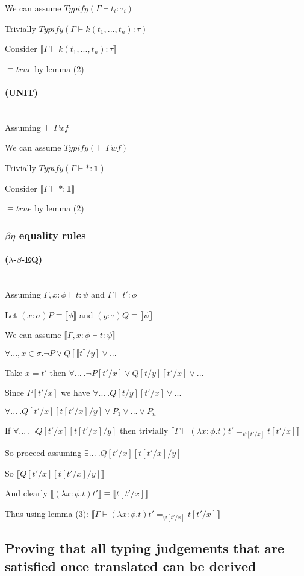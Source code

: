 \documentclass[12pt,a4paper,titlepage]{article}
\newcommand{\typify}{\textit{Typify}}
\newcommand{\bbrackets}[1]{\llbracket #1 \rrbracket}
\begin{document}
    We can assume $\typify (\Gamma \vdash t_i : \tau_i)$

    Trivially $\typify (\Gamma \vdash k(t_1, ..., t_n) : \tau)$

    Consider $\bbrackets{\Gamma \vdash k(t_1, ..., t_n): \tau}$

    $\equiv true$ by lemma (2)

    \paragraph{(UNIT)}\mbox{}\\

    Assuming $\vdash \Gamma wf$

    We can assume $\typify (\vdash \Gamma wf)$

    Trivially $\typify (\Gamma \vdash \ast : \textbf{1})$

    Consider $\bbrackets{\Gamma \vdash \ast : \textbf{1}}$

    $\equiv true$ by lemma (2)

    \subsubsection{$\beta\eta$ equality rules}

    \paragraph{($\lambda$-$\beta$-EQ)}\mbox{}\\

    Assuming $\Gamma, x: \phi \vdash t: \psi$ and $\Gamma \vdash t': \phi$

    Let $(x: \sigma)P \equiv \bbrackets{\phi}$ and $(y: \tau)Q \equiv \bbrackets{\psi}$

    We can assume $\bbrackets{\Gamma, x: \phi \vdash t: \psi}$

    $\forall ..., x \in \sigma . \neg P \lor Q[\bbrackets{t}/y] \lor ...$

    Take $x = t'$ then $\forall ...\ . \neg P[t'/x] \lor Q[t/y][t'/x] \lor ...$

    Since $P[t'/x]$ we have $\forall ...\ . Q[t/y][t'/x] \lor ...$

    $\forall ...\ . Q[t'/x][t[t'/x]/y] \lor P_1 \lor ... \lor P_n$

    If $\forall ...\ . \neg Q[t'/x][t[t'/x]/y]$ then trivially $\bbrackets{\Gamma \vdash (\lambda x: \phi . t)t' =_{\psi[t'/x]} t[t'/x]}$

    So proceed assuming $\exists ...\ . Q[t'/x][t[t'/x]/y]$

    So $\bbrackets{Q[t'/x][t[t'/x]/y]}$

    And clearly $\bbrackets{(\lambda x : \phi . t) t'} \equiv \bbrackets{t[t'/x]}$

    Thus using lemma (3): $\bbrackets{\Gamma \vdash (\lambda x : \phi . t)t' =_{\psi[t'/x]} t[t'/x]}$

    \subsection{Proving that all typing judgements that are satisfied once translated can be derived}
\end{document}

